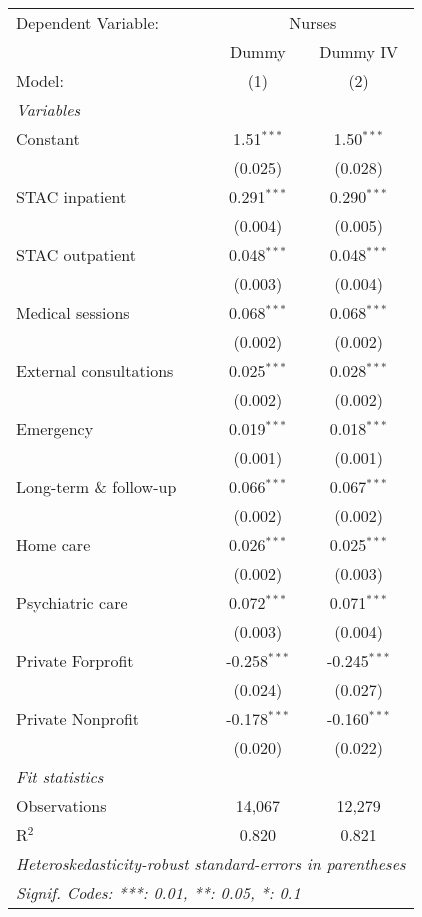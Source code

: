 
\begingroup
\centering
\begin{tabular}{lcc}
   \tabularnewline \midrule \midrule
   Dependent Variable: & \multicolumn{2}{c}{Nurses}\\
                           & Dummy          & Dummy IV \\   
   Model:                  & (1)            & (2)\\  
   \midrule
   \emph{Variables}\\
   Constant                & 1.51$^{***}$   & 1.50$^{***}$\\   
                           & (0.025)        & (0.028)\\   
   STAC inpatient          & 0.291$^{***}$  & 0.290$^{***}$\\   
                           & (0.004)        & (0.005)\\   
   STAC outpatient         & 0.048$^{***}$  & 0.048$^{***}$\\   
                           & (0.003)        & (0.004)\\   
   Medical sessions        & 0.068$^{***}$  & 0.068$^{***}$\\   
                           & (0.002)        & (0.002)\\   
   External consultations  & 0.025$^{***}$  & 0.028$^{***}$\\   
                           & (0.002)        & (0.002)\\   
   Emergency               & 0.019$^{***}$  & 0.018$^{***}$\\   
                           & (0.001)        & (0.001)\\   
   Long-term \& follow-up  & 0.066$^{***}$  & 0.067$^{***}$\\   
                           & (0.002)        & (0.002)\\   
   Home care               & 0.026$^{***}$  & 0.025$^{***}$\\   
                           & (0.002)        & (0.003)\\   
   Psychiatric care        & 0.072$^{***}$  & 0.071$^{***}$\\   
                           & (0.003)        & (0.004)\\   
   Private Forprofit       & -0.258$^{***}$ & -0.245$^{***}$\\   
                           & (0.024)        & (0.027)\\   
   Private Nonprofit       & -0.178$^{***}$ & -0.160$^{***}$\\   
                           & (0.020)        & (0.022)\\   
   \midrule
   \emph{Fit statistics}\\
   Observations            & 14,067         & 12,279\\  
   R$^2$                   & 0.820          & 0.821\\  
   \midrule \midrule
   \multicolumn{3}{l}{\emph{Heteroskedasticity-robust standard-errors in parentheses}}\\
   \multicolumn{3}{l}{\emph{Signif. Codes: ***: 0.01, **: 0.05, *: 0.1}}\\
\end{tabular}
\par\endgroup


